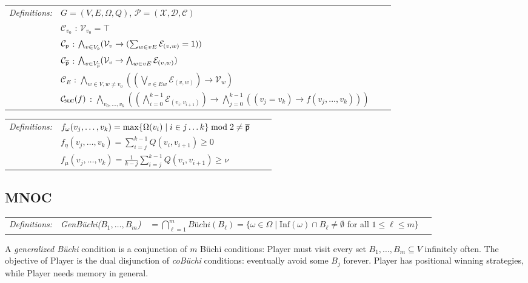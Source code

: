 \documentclass[12pt]{extarticle}
\newcommand{\definition}[1] {
    \begin{tcolorbox}[colback=mygray,colframe=mygray,sharp corners=all,top=0.01cm,bottom=0.01cm,left=0.1cm]
    \small
    \setlength{\tabcolsep}{2pt}
    \begin{tabular}{l l l l}
        \textit{Definitions:} & #1
    \end{tabular}
    \end{tcolorbox}
}
\begin{document}
\definition{
    $G=(V,E, \Omega, Q)$, $\mathcal{P} = (\mathcal{X}, \mathcal{D}, \mathcal{C})$
    \\ & $\mathcal{C}_{v_0}$ : $\mathcal{V}_{v_0} = \top$
    \\ & $\mathcal{C}_{\mathsf{p}}$ : $\bigwedge_{v \in V_{\mathsf{p}}} (\mathcal{V}_v \rightarrow (\sum_{w \in vE} \mathcal{E}_{(v,w)}= 1))$
    \\ & $\mathcal{C}_{\overline{\mathsf{p}}}$ : $\bigwedge_{v \in V_{\overline{\mathsf{p}}}} (\mathcal{V}_v \rightarrow \bigwedge_{w \in vE} \mathcal{E}_{(v,w)})$
    \\ & $\mathcal{C}_{\!E}$ : $\bigwedge_{w \in V, w \neq v_0} ((\bigvee_{v \in Ew} \mathcal{E}_{(v,w)}) \rightarrow \mathcal{V}_w)$
    \\ & $\mathcal{C}_{\subnoc}(f)$ : $\bigwedge_{v_0, \dots, v_k} \left( \left(\bigwedge_{i=0}^{k-1} \mathcal{E}_{(v_i,v_{i+1})}\right) \to \bigwedge_{j=0}^{k-1} ((v_j = v_k) \to f(v_j, \dots, v_k)) \right)$
}
\definition{
    $f_\omega(v_j, \dots, v_k) = \max\{\Omega(v_i) \mid i\in j\dots k\} \bmod 2 \ne \overline{\mathsf{p}}$
    \\ & $f_\eta(v_j, \dots, v_k) = \sum_{i=j}^{k-1} Q(v_i, v_{i+1}) \ge 0$
    \\ & $f_\mu(v_j, \dots, v_k) = \frac{1}{k-j} \sum_{i=j}^{k-1} Q(v_i, v_{i+1}) \ge \nu$
}

\subsection{MNOC}

\definition{
    \textit{GenB\"uchi($B_1,\ldots,B_m$)} &$ = \bigcap_{\ell=1}^{m} \textit{B\"uchi}(B_\ell) = \{\omega \in \Omega \mid \mathrm{Inf}(\omega) \cap B_\ell \neq \emptyset$ for all $1 \leqslant \ell \leqslant m\}$
}
A \textit{generalized B\"uchi} condition is a conjunction of $m$ B\"uchi conditions: Player \even must visit every set $B_1,\ldots,B_m \subseteq V$ infinitely often. The objective of Player \odd is the dual disjunction of \textit{coB\"uchi} conditions: eventually avoid some $B_j$ forever. Player \odd has positional winning strategies, while Player \even needs memory in general.
\end{document}
